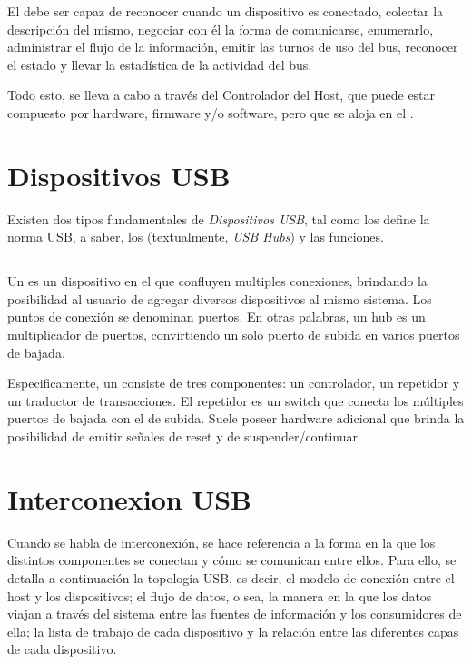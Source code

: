   El \host debe ser capaz de reconocer cuando un dispositivo es conectado,
  colectar la descripción del mismo, negociar con él la forma de comunicarse,
  enumerarlo, administrar el flujo de la información, emitir las turnos de uso
  del bus, reconocer el estado y llevar la estadística de la actividad del bus.

  Todo esto, se lleva a cabo a través del Controlador del Host, que puede estar
  compuesto por hardware, firmware y/o software, pero que se aloja en el \host.

  \section{Dispositivos USB}
  Existen dos tipos fundamentales de {\it Dispositivos USB}, tal como los define
  la norma USB, a saber, los \hubs (textualmente, {\it USB Hubs}) y
  las funciones.

  \subsection{\Hub}
  Un \hub es un dispositivo en el que confluyen multiples conexiones, brindando
  la posibilidad al usuario de agregar diversos dispositivos al mismo sistema.
  Los puntos de conexión se denominan puertos. En otras palabras, un hub es
  un multiplicador de puertos, convirtiendo un solo puerto de subida en varios
  puertos de bajada.

  Especificamente, un  consiste de tres componentes: un controlador, un
  repetidor y un traductor de transacciones. El repetidor es un switch que
  conecta los múltiples puertos de bajada con el de subida. Suele poseer
  hardware adicional que brinda la posibilidad de emitir señales de reset y de
  suspender/continuar

  \section{Interconexion USB}
  Cuando se habla de interconexión, se hace referencia a la forma en la que los
  distintos componentes se conectan y cómo se comunican entre ellos. Para ello,
  se detalla a continuación la topología USB, es decir, el modelo de conexión
  entre el host y los dispositivos; el flujo de datos, o sea, la manera en la
  que los datos viajan a través del sistema entre las fuentes de información y
  los consumidores de ella; la lista de trabajo de cada dispositivo y la
  relación entre las diferentes capas de cada dispositivo.

